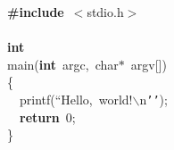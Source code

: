 {{\def\dash{\raise2.1pt\hbox{\rule{5pt}{0.3pt}}\hspace{1pt}}\begin{tabbing}
{\textbf{\#include}}\ $<$stdio.h$>$\\
\\
{\textbf{int}}\ \ \\
main({\textbf{int}}\ argc,\ char$\ast$\ argv{[}{]})\\
\{\\
\ \ printf(``Hello,\ world!$\backslash$n{\texttt{{'}{'}}});\\
\ \ {\textbf{return}}\ 0;\\
\}
\end{tabbing}}}
